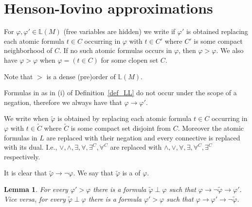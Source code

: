 \documentclass[11pt,oneside]{amsart}
\theoremstyle{plain}
\newtheorem{lemma}[theorem]{Lemma}
\theoremstyle{remark}
\renewcommand*{\emph}[1]{%
   \smash{\tikz[baseline]\node[rectangle, fill=olive!25, rounded corners, inner xsep=0.5ex, inner ysep=0.2ex, anchor=base, minimum height = 2.7ex]{#1};}}
\begin{document}
\def\ceq#1#2#3{\parbox[t]{35ex}{$\displaystyle #1$}\parbox{5ex}{\hfil $#2$}{$\displaystyle #3$}}


\section{Henson-Iovino approximations}\label{ultrapws}


For $\varphi,\varphi'\in\mathds{L}(M)$ (free variables are hidden) we write \emph{$\varphi'>\varphi$\/} if $\varphi'$ is obtained replacing each atomic formula $t\in C$ occurring in $\varphi$ with $t\in C'$ where $C'$ is some compact neighborhood of $C$.
If no such atomic formulas occurs in $\varphi$, then $\varphi>\varphi$.
We also have $\varphi>\varphi$ when $\varphi=(t\in C)$ for some clopen set $C$.

Note that $>$ is a dense (pre)order of $\mathds{L}(M)$.

Formulas in as in (i) of Definition~\ref{def_LL} do not occur under the scope of a negation, therefore we always have that $\varphi\to\varphi'$.

We write \emph{$\tilde{\varphi}\perp\varphi$\/} when $\tilde{\varphi}$ is obtained by replacing each atomic formula $t\in C$ occurring in $\varphi$ with $t\in\tilde{C}$ where $\tilde{C}$ is some compact set disjoint from $C$. 
Moreover the atomic formulas in $L$ are replaced with their negation and every connective is replaced with its dual.
I.e., $\vee, \wedge, \exists, \forall, \exists^C, \forall^C$ are replaced with $\wedge,\vee,\forall,\exists,\forall^C,\exists^C$ respectively.

It is clear that $\tilde{\varphi}\rightarrow\neg\varphi$.
We say that  $\tilde{\varphi}$ is a \emph{strong negation} of $\varphi$.


\begin{lemma}\label{lem_interpolation}
  For every $\varphi'>\varphi$ there is a formula $\tilde{\varphi}\perp\varphi$ such that $\varphi\rightarrow\neg \tilde{\varphi}\rightarrow\varphi'$. 
  Vice versa, for every $\tilde{\varphi}\perp\varphi$ there is a formula $\varphi'>\varphi$ such that  $\varphi\rightarrow\varphi'\rightarrow\neg \tilde{\varphi}$.
\end{lemma}
\end{document}
